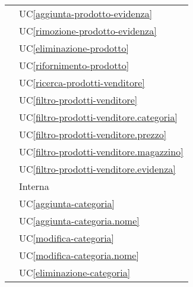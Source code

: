 \begin{longtable}{C{6cm} C{6cm}}
     & UC\ref{aggiunta-prodotto-evidenza} \\

     & UC\ref{rimozione-prodotto-evidenza} \\
        
     & UC\ref{eliminazione-prodotto} \\

     & UC\ref{rifornimento-prodotto} \\

     & UC\ref{ricerca-prodotti-venditore} \\

     & UC\ref{filtro-prodotti-venditore} \\

     & UC\ref{filtro-prodotti-venditore.categoria} \\

     & UC\ref{filtro-prodotti-venditore.prezzo} \\

     & UC\ref{filtro-prodotti-venditore.magazzino} \\

     & UC\ref{filtro-prodotti-venditore.evidenza} \\

     & Interna \\

     & UC\ref{aggiunta-categoria} \\
        
     & UC\ref{aggiunta-categoria.nome} \\
        
     & UC\ref{modifica-categoria} \\
        
     & UC\ref{modifica-categoria.nome} \\

     & UC\ref{eliminazione-categoria} \\


\end{longtable}
